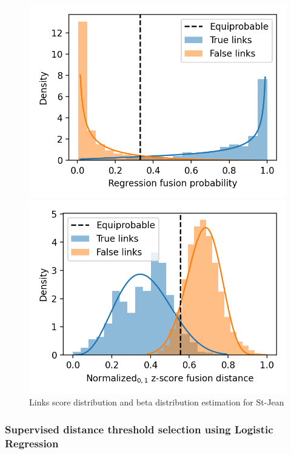 \begin{figure}
  \caption{Links score distribution and beta distribution estimation for St-Jean}
  \label{fig:links_score_density}

  \label{fig:links_score_density_fusion_regression}
  \includegraphics[width=\linewidth]{img/links_score_density_fusion_regression.png}

  \label{fig:links_score_density_fusion_z_score}
  \includegraphics[width=\linewidth]{img/links_score_density_fusion_z_score.png}
\end{figure}

\subsubsection{Supervised distance threshold selection using Logistic Regression}

